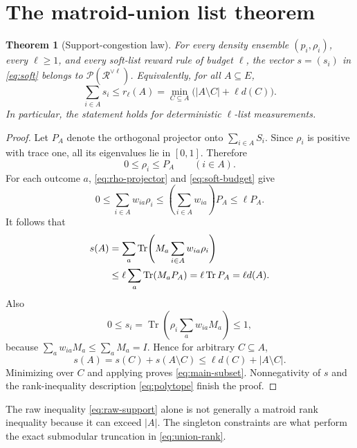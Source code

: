 \documentclass[11pt]{article}
\newtheorem{theorem}{Theorem}[section]
\theoremstyle{definition}
\theoremstyle{remark}
\newcommand{\cP}{\mathcal P}
\newcommand{\cR}{\mathcal R}
\newcommand{\Tr}{\operatorname{Tr}}
\begin{document}
\section{The matroid-union list theorem}\label{sec:main}

\begin{theorem}[Support-congestion law]\label{thm:main}
For every density ensemble $(p_i,\rho_i)$, every $\ell\geq1$, and every
soft-list reward rule of budget $\ell$, the vector $s=(s_i)$ in
\eqref{eq:soft} belongs to $\cP(\cR^{\vee\ell})$.  Equivalently, for all
$A\subseteq E$,
\begin{equation}\label{eq:main-subset}
 \sum_{i\in A}s_i
 \leq r_\ell(A)
 =\min_{C\subseteq A}\bigl(|A\setminus C|+\ell d(C)\bigr).
\end{equation}
In particular, the statement holds for deterministic $\ell$-list
measurements.
\end{theorem}

\begin{proof}
Let $P_A$ denote the orthogonal projector onto
$\sum_{i\in A}S_i$.  Since $\rho_i$ is positive with trace one, all its
eigenvalues lie in $[0,1]$.  Therefore
\begin{equation}\label{eq:rho-projector}
 0\leq\rho_i\leq P_A\qquad(i\in A).
\end{equation}
For each outcome $a$, \eqref{eq:rho-projector} and
\eqref{eq:soft-budget} give
\[
 0\leq\sum_{i\in A}w_{ia}\rho_i
 \leq\left(\sum_{i\in A}w_{ia}\right)P_A
 \leq\ell P_A.
\]
It follows that
\begin{align}
 s(A)
 &=\sum_a\Tr\!\left(M_a\sum_{i\in A}w_{ia}\rho_i\right)\notag\\
 &\leq\ell\sum_a\Tr(M_aP_A)
 =\ell\Tr P_A
 =\ell d(A).                                      \label{eq:raw-support}
\end{align}
Also
\[
 0\leq s_i=\Tr\!\left(\rho_i\sum_a w_{ia}M_a\right)\leq1,
\]
because $\sum_a w_{ia}M_a\leq\sum_aM_a=I$.  Hence for arbitrary
$C\subseteq A$,
\[
 s(A)=s(C)+s(A\setminus C)
 \leq\ell d(C)+|A\setminus C|.
\]
Minimizing over $C$ and applying  proves
\eqref{eq:main-subset}.  Nonnegativity of $s$ and the rank-inequality
description \eqref{eq:polytope} finish the proof.
\end{proof}

The raw inequality \eqref{eq:raw-support} alone is not generally a matroid
rank inequality because it can exceed $|A|$.  The singleton constraints are
what perform the exact submodular truncation in \eqref{eq:union-rank}.
\end{document}
